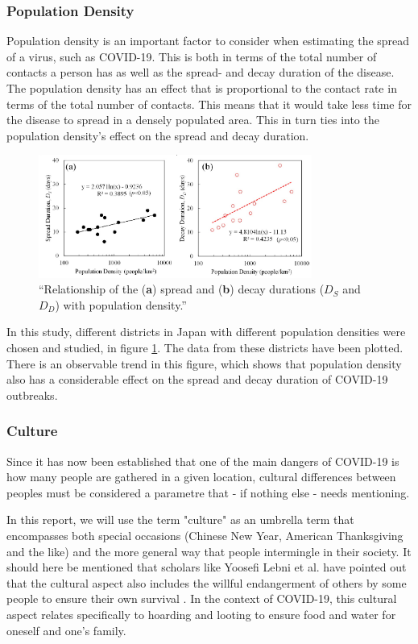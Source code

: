 \subsubsection{Population Density}
Population density is an important factor to consider when estimating the spread of a virus, such as COVID-19. This is both in terms of the total number of contacts a person has as well as the spread- and decay duration of the disease. \\
The population density has an effect that is proportional to the contact rate \citep{rocklov_high_2020} in terms of the total number of contacts. This means that it would take less time for the disease to spread in a densely populated area. This in turn ties into the population density's effect on the spread and decay duration.
\begin{figure}[H]
    \centering
    \includegraphics[width=0.8\textwidth]{0_billeder/Spread-Decay.png}
    \caption{``Relationship of the (\textbf{a}) spread and (\textbf{b}) decay durations ($D_S$ and $D_D$) with population density.'' \citep{rashed_influence_2020}}
    \label{fig:Spread-Decay}
\end{figure}
In this study, different districts in Japan with different population densities were chosen and studied, in figure \ref{fig:Spread-Decay}. The data from these districts have been plotted. There is an observable trend in this figure, which shows that population density also has a considerable effect on the spread and decay duration of COVID-19 outbreaks. 



\subsubsection{Culture}
Since it has now been established that one of the main dangers of COVID-19 is how many people are gathered in a given location, cultural differences between peoples must be considered a parametre that - if nothing else - needs mentioning.

In this report, we will use the term "culture" as an umbrella term that encompasses both special occasions (Chinese New Year, American Thanksgiving and the like) and the more general way that people intermingle in their society. It should here be mentioned that scholars like Yoosefi Lebni et al. have pointed out that the cultural aspect also includes the willful endangerment of others by some people to ensure their own survival \citep{yoosefi_lebni_how_2020}. In the context of COVID-19, this cultural aspect relates specifically to hoarding and looting to ensure food and water for oneself and one's family.

